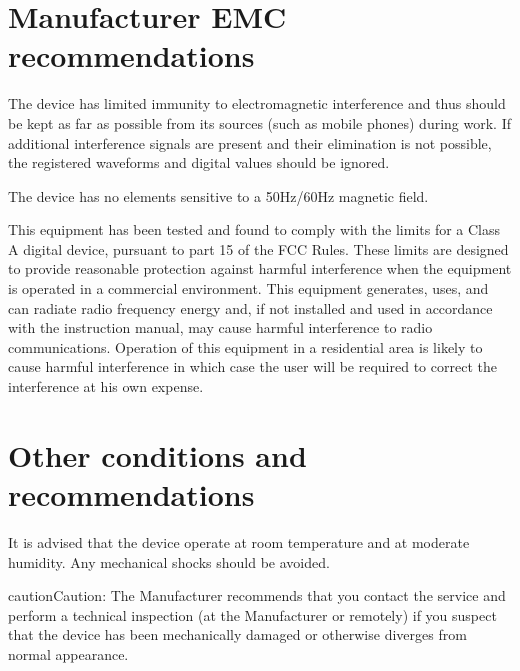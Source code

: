 \documentclass[letterpaper,10pt,english]{sphinxmanual}
\begin{document}
\section{Manufacturer EMC recommendations}
\label{\detokenize{content/manufacturer_guidelines:manufacturer-emc-recommendations}}
\sphinxAtStartPar
{}

\sphinxAtStartPar
The device has limited immunity to electromagnetic interference and thus
should be kept as far as possible from its sources (such as mobile
phones) during work. If additional interference signals are present and
their elimination is not possible, the registered waveforms and digital
values should be ignored.

\sphinxAtStartPar
The device has no elements sensitive to a 50Hz/60Hz magnetic field.

\sphinxAtStartPar
{}

\sphinxAtStartPar
This equipment has been tested and found to comply with the limits for a Class A digital device, pursuant to part 15 of the FCC Rules. These limits are designed to provide reasonable protection against harmful interference when the equipment is operated in a commercial environment. This equipment generates, uses, and can radiate radio frequency energy and, if not installed and used in accordance with the instruction manual, may cause harmful interference to radio communications. Operation of this equipment in a residential area is likely to cause harmful interference in which case the user will be required to correct the interference at his own expense.


\section{Other conditions and recommendations}
\label{\detokenize{content/manufacturer_guidelines:other-conditions-and-recommendations}}
\sphinxAtStartPar
It is advised that the device operate at room temperature and at
moderate humidity. Any mechanical shocks should be avoided.

\begin{sphinxadmonition}{caution}{Caution:}
\sphinxAtStartPar
The Manufacturer recommends that you contact the service and perform a technical inspection (at the Manufacturer or remotely)
if you suspect that the device has been mechanically damaged or otherwise diverges from normal appearance.
\end{sphinxadmonition}
\end{document}
